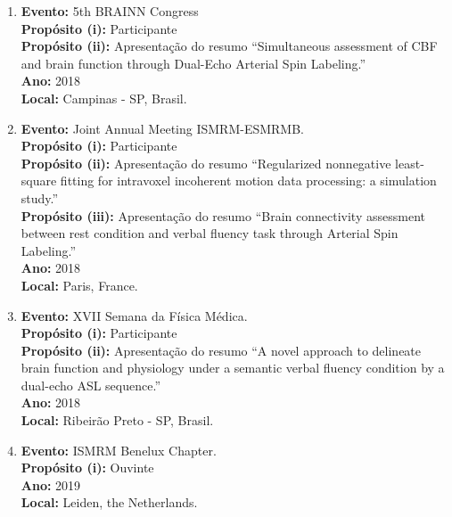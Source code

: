 \documentclass[a4paper,oneside,10pt]{article}
\begin{document}
\begin{enumerate}
        \item   \textbf{Evento:} 5th BRAINN Congress \mbox{} \\
        \textbf{Propósito (i):} Participante\\
        \textbf{Propósito (ii):} Apresentação do resumo ``Simultaneous assessment of CBF and brain function through Dual-Echo Arterial Spin Labeling.'' \mbox{}\\
        \textbf{Ano:} 2018\\
        \textbf{Local:} Campinas - SP, Brasil.

        \item   \textbf{Evento:} Joint Annual Meeting ISMRM-ESMRMB. \mbox{} \\
        \textbf{Propósito (i):} Participante \\
        \textbf{Propósito (ii):} Apresentação do resumo ``Regularized nonnegative least-square fitting for intravoxel incoherent motion data processing: a simulation study.''\\
        \textbf{Propósito (iii):} Apresentação do resumo ``Brain connectivity assessment between rest condition and verbal fluency task through Arterial Spin Labeling.'' \\
        \textbf{Ano:} 2018\\
        \textbf{Local:} Paris, France.

        \item   \textbf{Evento:} XVII Semana da Física Médica. \mbox{} \\
        \textbf{Propósito (i):} Participante\\
        \textbf{Propósito (ii):} Apresentação do resumo ``A novel approach to delineate brain function and physiology under a semantic verbal fluency condition by a dual-echo ASL sequence.''\\
        \textbf{Ano:} 2018\\
        \textbf{Local:} Ribeirão Preto - SP, Brasil.

        \item   \textbf{Evento:} ISMRM Benelux Chapter. \mbox{} \\
        \textbf{Propósito (i):} Ouvinte\\
        \textbf{Ano:} 2019\\
        \textbf{Local:} Leiden, the Netherlands.


\end{enumerate}
\end{document}
